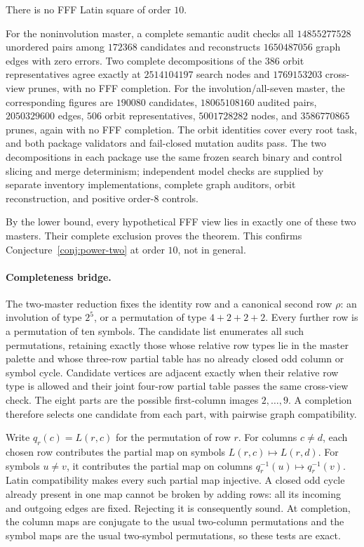 \begin{computationaltheorem}
\label{cthm:order10-nonexistence}
There is no FFF Latin square of order $10$.
\end{computationaltheorem}

For the noninvolution master, a complete semantic audit checks all
$14855277528$ unordered pairs among $172368$ candidates and reconstructs
$1650487056$ graph edges with zero errors.  Two complete decompositions of
the $386$ orbit representatives agree exactly at $2514104197$ search nodes
and $1769153203$ cross-view prunes, with no FFF completion.  For the
involution/all-seven master, the corresponding figures are $190080$
candidates, $18065108160$ audited pairs, $2050329600$ edges, $506$ orbit
representatives, $5001728282$ nodes, and $3586770865$ prunes, again with no
FFF completion.  The orbit identities cover every root task, and both package
validators and fail-closed mutation audits pass.  The two decompositions in
each package use the same frozen search binary and control slicing and merge
determinism; independent model checks are supplied by separate inventory
implementations, complete graph auditors, orbit reconstruction, and positive
order-$8$ controls.

By the lower bound, every hypothetical FFF view lies in exactly one of these
two masters.  Their complete exclusion proves the theorem.  This confirms
Conjecture~\ref{conj:power-two} at order $10$, not in general.

\paragraph{Completeness bridge.}
The two-master reduction fixes the identity row and a canonical second row
$\rho$: an involution of type $2^5$, or a permutation of type $4+2+2+2$.
Every further row is a permutation of ten symbols.  The candidate list
enumerates all such permutations, retaining exactly those whose relative
row types lie in the master palette and whose three-row partial table has
no already closed odd column or symbol cycle.  Candidate vertices are
adjacent exactly when their relative row type is allowed and their joint
four-row partial table passes the same cross-view check.  The eight parts
are the possible first-column images $2,\ldots,9$.  A completion therefore
selects one candidate from each part, with pairwise graph compatibility.

Write $q_r(c)=L(r,c)$ for the permutation of row $r$.  For columns $c\ne d$,
each chosen row contributes the partial map on symbols
$L(r,c)\mapsto L(r,d)$.  For symbols $u\ne v$, it contributes the
partial map on columns $q_r^{-1}(u)\mapsto q_r^{-1}(v)$.  Latin compatibility
makes every such partial map injective.  A closed odd cycle already present
in one map cannot be broken by adding rows: all its incoming and outgoing
edges are fixed.  Rejecting it is consequently sound.  At completion, the
column maps are conjugate to the usual two-column permutations and the
symbol maps are the usual two-symbol permutations, so these tests are exact.

